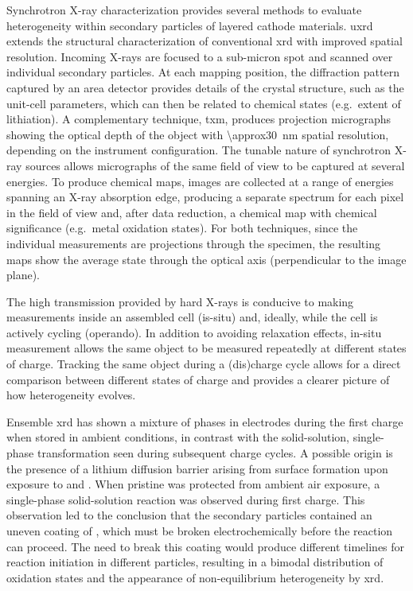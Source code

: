 \documentclass{article}
\begin{document}

Synchrotron X-ray characterization provides several methods to
evaluate heterogeneity within secondary particles of layered cathode
materials. \Gls{uxrd} extends the structural characterization of
conventional \gls{xrd} with improved spatial resolution. Incoming
X-rays are focused to a sub-micron spot and scanned over individual
secondary particles. At each mapping position, the diffraction pattern
captured by an area detector provides details of the crystal
structure, such as the unit-cell parameters, which can then be related
to chemical states (e.g.\ extent of lithiation). A complementary
technique, \Gls{txm}, produces projection micrographs showing the
optical depth of the object with \SI{\approx30}{nm} spatial
resolution, depending on the instrument configuration. The tunable
nature of synchrotron X-ray sources allows micrographs of the same
field of view to be captured at several energies. To produce chemical
maps, images are collected at a range of energies spanning an X-ray
absorption edge, producing a separate spectrum for each pixel in the
field of view and, after data reduction, a chemical map with chemical
significance (e.g.\ metal oxidation states). For both techniques,
since the individual measurements are projections through the
specimen, the resulting maps show the average state through the
optical axis (perpendicular to the image plane).

The high transmission provided by hard X-rays is conducive to making
measurements inside an assembled cell (is-situ) and, ideally, while
the cell is actively cycling (operando). In addition to avoiding
relaxation effects, in-situ measurement allows the same object to be
measured repeatedly at different states of charge. Tracking the same
object during a (dis)charge cycle allows for a direct comparison
between different states of charge and provides a clearer picture of
how heterogeneity evolves.


Ensemble \gls{xrd} has shown a mixture of phases in \nca{} electrodes
during the first charge when stored in ambient conditions, in contrast
with the solid-solution, single-phase transformation seen during
subsequent charge cycles\cite{robert2015}. A possible origin is the
presence of a lithium diffusion barrier arising from surface
 formation upon exposure to  and . When
pristine \nca{} was protected from ambient air exposure, a
single-phase solid-solution reaction was observed during first
charge\cite{grenier2017}. This observation led to the conclusion that
the secondary particles contained an uneven coating of ,
which must be broken electrochemically before the reaction can
proceed. The need to break this coating would produce different
timelines for reaction initiation in different particles, resulting in
a bimodal distribution of oxidation states and the appearance of
non-equilibrium heterogeneity by \gls{xrd}.
\end{document}
